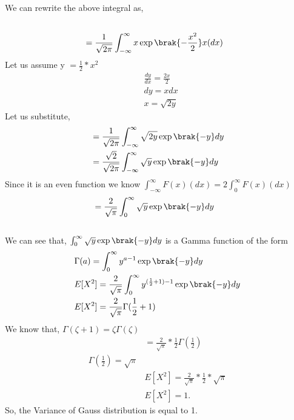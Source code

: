 \documentclass[journal,12pt,twocolumn]{IEEEtran}
\renewcommand\thesection{\arabic{section}}
\begin{document}
\begin{enumerate}[label=\thesection.\arabic*
,ref=\thesection.\theenumi]
We can rewrite the above integral as,
\begin{align*}
\\
& = \frac{1}{\sqrt{2\pi}}\int_{-\infty}^{\infty}x\exp\brak{-\frac{x^2}{2}}x(dx)
\end{align*}
Let us assume  y $ = \frac{1}{2}*x^2$
\begin{align*}
& \frac{dy}{dx} = \frac{2x}{2}
\\
& dy = xdx
\\
& x = \sqrt{2y}
\end{align*}
Let us substitute,
\begin{align*}
& = \frac{1}{\sqrt{2\pi}}\int_{-\infty}^{\infty}\sqrt{2y}\exp\brak{-y}dy
\\
& = \frac{\sqrt{2}}{\sqrt{2\pi}}\int_{-\infty}^{\infty}\sqrt{y}\exp\brak{-y}dy
\end{align*}
Since it is an even function we know $\int_{-\infty}^{\infty}F(x)(dx) = 2\int_{0}^{\infty}F(x)(dx)$
\begin{align*}
& = \frac{2}{\sqrt{\pi}}\int_{0}^{\infty}\sqrt{y}\exp\brak{-y}dy
\end{align*}
\\
We can see that, $\int_{0}^{\infty}\sqrt{y}\exp\brak{-y}dy$ is a Gamma function of the form
\begin{align*}
&\Gamma(a)= \int_{0}^{\infty}{y}^{a-1}\exp\brak{-y}dy
\\
& E[X^2] = \frac{2}{\sqrt{\pi}}\int_{0}^{\infty}{y}^{(\frac{1}{2}+1)-1}\exp\brak{-y}dy
\\
& E[X^2] = \frac{2}{\sqrt{\pi}}\Gamma(\frac{1}{2}+1)
\end{align*}
We know that, $\Gamma(\zeta +1) = \zeta\Gamma(\zeta)$
\begin{align*}
& = \frac{2}{\sqrt{\pi}}*\frac{1}{2}\Gamma(\frac{1}{2})
\\
\Gamma(\frac{1}{2}) = \sqrt{\pi}
\\
& E[X^2] = \frac{2}{\sqrt{\pi}}* \frac{1}{2}*\sqrt{\pi}
\\
& E[X^2] = 1.
\end{align*}
So, the Variance of Gauss distribution is equal to 1.
%
\end{enumerate}
\end{document}
